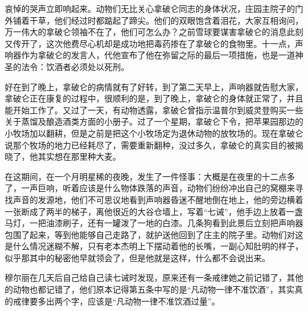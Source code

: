 哀悼的哭声立即响起来。动物们无比关心拿破仑同志的身体状况，庄园主院子的门外铺着干草，他们经过时都踮起了蹄尖。他们的双眼饱含着泪花，大家互相询问，万一伟大的拿破仑领袖不在了，他们可怎么办？之前雪球要谋害拿破仑的消息此刻又传开了，这次他费尽心机却是成功地把毒药掺在了拿破仑的食物里。十一点，声响器作为拿破仑的发言人，代他宣布了他在弥留之际的最后一项措施，也是一道神圣的法令：饮酒者必须处以死刑。

好在到了晚上，拿破仑的病情就有了好转，到了第二天早上，声响器就告慰大家，拿破仑正在康复的过程中，很顺利的是，到了晚上，拿破仑的身体就正常了，并且能开始工作了。又过了一天，有动物透露，拿破仑曾指示温普尔到威灵登购买一些关于蒸馏及酿造酒类方面的小册子。过了一个星期，拿破仑下令，把苹果园那边的小牧场加以翻耕，但是之前是把这个小牧场定为退休动物的放牧场的。现在拿破仑说那个牧场的地力已经耗尽了，需要重新翻种，没过多久，拿破仑的真实目的被揭晓了，他其实想在那里种大麦。

在这期间，在一个月明星稀的夜晚，发生了一件怪事：大概是在夜里的十二点多了，一声巨响，听着应该是什么物体跌落的声音，动物们纷纷冲出自己的窝棚来寻找声音的发源地，他们不可思议地看到声响器昏迷不醒地倒在地上，他的旁边横着一张断成了两半的梯子，离他很近的大谷仓墙上，写着“七诫”，他手边上放着一盏马灯，一把油漆刷子，还有一罐泼了一地的白漆。几条狗看到此景后立刻把声响器包围了起来，等到他能够自己走路了，就护送他回到了庄主的院子里。动物们对这是什么情况迷糊不解，只有老本杰明上下摆动着他的长嘴，一副心知肚明的样子，似乎那其中的秘密他早就领会了，但是他就是这样，什么都不会说出来。

穆尔丽在几天后自己给自己读七诫时发现，原来还有一条戒律她之前记错了，其他的动物也都记错了，他们原本记得第五条中写的是“凡动物一律不准饮酒”，其实真的戒律要多出两个字，应该是“凡动物一律不准饮酒过量”。
